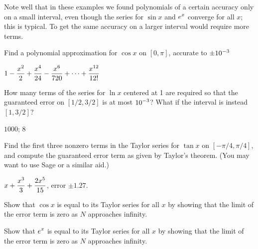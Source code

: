 Note well that in these examples we found polynomials of a certain
accuracy only on a small interval, even though the series for $\sin x$
and $\displaystyle e^x$ converge for all $x$; this is typical. To get the same
accuracy on a larger interval would require more terms. 

\begin{exercises}

\begin{exercise} Find a polynomial approximation for $\cos x$ on $[0,\pi]$,
accurate to $\displaystyle \pm 10^{-3}$
\begin{answer} $\displaystyle 1-{x^2\over2}+{x^4\over24}-{x^6\over 720}
+\cdots+{x^{12}\over 12!}$
\end{answer}\end{exercise}

\begin{exercise} How many terms of the series for $\ln x$ centered at 1 are
required so that the guaranteed error on $[1/2,3/2]$ is
at most $\displaystyle 10^{-3}$? What if the interval is instead $[1,3/2]$? 
\begin{answer} $1000$; $8$ 
\end{answer}\end{exercise}

\begin{exercise} Find the first three nonzero terms in the Taylor series for
$\tan x$ on $[-\pi/4,\pi/4]$,
and compute the guaranteed error term as given by 
Taylor's theorem. (You may want to use Sage or a similar aid.)
\begin{answer} $\displaystyle x+{x^3\over3}+{2x^5\over15}$, error $\pm 1.27$.
\end{answer}\end{exercise}

\begin{exercise} Show that $\cos x$ is equal to its Taylor series for all $x$
by showing that the limit of the error term is zero as $N$ approaches
infinity. 
\end{exercise}

\begin{exercise} Show that $\displaystyle e^x$ is equal to its Taylor series for all $x$
by showing that the limit of the error term is zero as $N$ approaches
infinity. 
\end{exercise}

\end{exercises}

